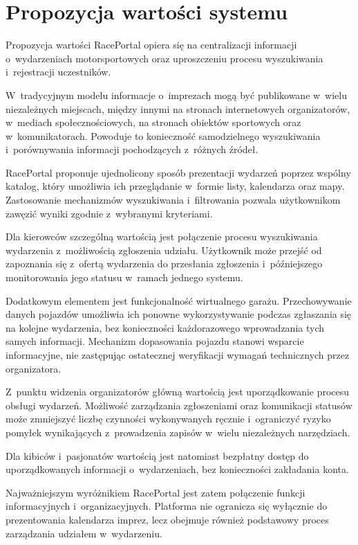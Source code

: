 \documentclass{sprz}
\begin{document}
\section{Propozycja wartości systemu}
Propozycja wartości RacePortal opiera się na centralizacji informacji o~wydarzeniach motorsportowych oraz uproszczeniu procesu wyszukiwania i~rejestracji uczestników.

W~tradycyjnym modelu informacje o~imprezach mogą być publikowane w~wielu niezależnych miejscach, między innymi na stronach internetowych organizatorów, w~mediach społecznościowych, na stronach obiektów sportowych oraz w~komunikatorach. Powoduje to konieczność samodzielnego wyszukiwania i~porównywania informacji pochodzących z~różnych źródeł.

RacePortal proponuje ujednolicony sposób prezentacji wydarzeń poprzez wspólny katalog, który umożliwia ich przeglądanie w~formie listy, kalendarza oraz mapy. Zastosowanie mechanizmów wyszukiwania i~filtrowania pozwala użytkownikom zawęzić wyniki zgodnie z~wybranymi kryteriami.

Dla kierowców szczególną wartością jest połączenie procesu wyszukiwania wydarzenia z~możliwością zgłoszenia udziału. Użytkownik może przejść od zapoznania się z~ofertą wydarzenia do przesłania zgłoszenia i~późniejszego monitorowania jego statusu w~ramach jednego systemu.

Dodatkowym elementem jest funkcjonalność wirtualnego garażu. Przechowywanie danych pojazdów umożliwia ich ponowne wykorzystywanie podczas zgłaszania się na kolejne wydarzenia, bez konieczności każdorazowego wprowadzania tych samych informacji. Mechanizm dopasowania pojazdu stanowi wsparcie informacyjne, nie zastępując ostatecznej weryfikacji wymagań technicznych przez organizatora.

Z~punktu widzenia organizatorów główną wartością jest uporządkowanie procesu obsługi wydarzeń. Możliwość zarządzania zgłoszeniami oraz komunikacji statusów może zmniejszyć liczbę czynności wykonywanych ręcznie i~ograniczyć ryzyko pomyłek wynikających z~prowadzenia zapisów w~wielu niezależnych narzędziach.

Dla kibiców i~pasjonatów wartością jest natomiast bezpłatny dostęp do uporządkowanych informacji o~wydarzeniach, bez konieczności zakładania konta.

Najważniejszym wyróżnikiem RacePortal jest zatem połączenie funkcji informacyjnych i~organizacyjnych. Platforma nie ogranicza się wyłącznie do prezentowania kalendarza imprez, lecz obejmuje również podstawowy proces zarządzania udziałem w~wydarzeniu.
\end{document}
